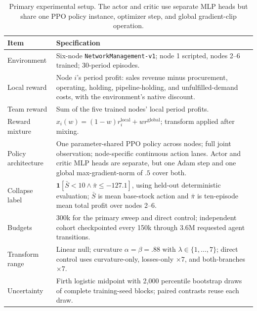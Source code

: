 \begin{table}[t]
\caption{Primary experimental setup. The actor and critic use separate MLP heads but share one PPO policy instance, optimizer step, and global gradient-clip operation.}
\label{tab:setup}
\centering\small
\begin{tabular}{@{}p{}p{}@{}}
\toprule
Item & Specification \\
\midrule
Environment & Six-node \texttt{NetworkManagement-v1}; node 1 scripted, nodes 2--6 trained; 30-period episodes. \\
Local reward & Node $i$'s period profit: sales revenue minus procurement, operating, holding, pipeline-holding, and unfulfilled-demand costs, with the environment's native discount. \\
Team reward & Sum of the five trained nodes' local period profits. \\
Reward mixture & $x_i(w)=(1-w)r_i^{\mathrm{local}}+wr^{\mathrm{global}}$; transform applied after mixing. \\
Policy architecture & One parameter-shared PPO policy across nodes; full joint observation; node-specific continuous action lanes. Actor and critic MLP heads are separate, but one Adam step and one global max-gradient-norm of $.5$ cover both. \\
Collapse label & $\mathbf 1[\bar S<10\wedge\bar\pi\le-127.1]$, using held-out deterministic evaluation; $\bar S$ is mean base-stock action and $\bar\pi$ is ten-episode mean total profit over nodes 2--6. \\
Budgets & 300k for the primary sweep and direct control; independent cohort checkpointed every 150k through 3.6M requested agent transitions. \\
Transform range & Linear null; curvature $\alpha=\beta=.88$ with $\lambda\in\{1,\ldots,7\}$; direct control uses curvature-only, losses-only $\times7$, and both-branches $\times7$. \\
Uncertainty & Firth logistic midpoint with 2,000 percentile bootstrap draws of complete training-seed blocks; paired contrasts reuse each draw. \\
\bottomrule
\end{tabular}
\end{table}
